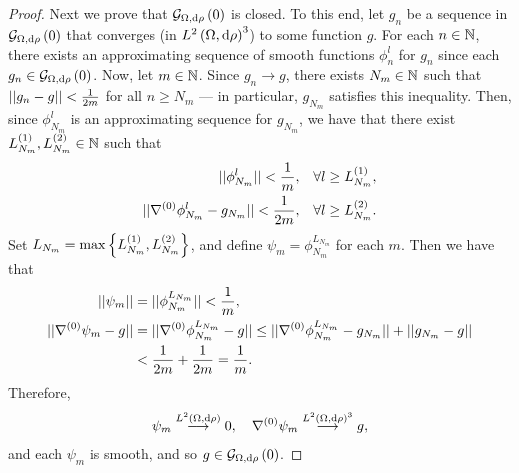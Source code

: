 \documentclass[11pt]{report}
\newcommand{\ograd}{\grad^{(0)}}
\begin{document}
\begin{proof}
	Next we prove that $\mathcal{G}_{ \Omega, \mathrm{d}\rho}\left( 0 \right)$ is closed.
	To this end, let $g_n$ be a sequence in $\mathcal{G}_{ \Omega, \mathrm{d}\rho}\left( 0 \right)$ that converges (in $L^{2}\left( \Omega,\mathrm{d}\rho \right)^3$) to some function $g$.
	For each $n\in\mathbb{N}$, there exists an approximating sequence of smooth functions $\phi_n^l$ for $g_n$ since each $g_n\in\mathcal{G}_{ \Omega, \mathrm{d}\rho}\left( 0 \right)$.
	Now, let $m\in\mathbb{N}$.
	Since $g_n\rightarrow g$, there exists $N_m\in\mathbb{N}$ such that $\lvert\lvert g_n-g \rvert\rvert<\frac{1}{2m}$ for all $n\geq N_m$ --- in particular, $g_{N_m}$ satisfies this inequality.
	Then, since $\phi_{N_m}^l$ is an approximating sequence for $g_{N_m}$, we have that there exist $L_{N_m}^{(1)}, L_{N_m}^{(2)}\in\mathbb{N}$ such that
	\begin{align*}
		\norm{\phi_{N_m}^l} < \recip{m}, &\quad\forall l\geq L_{N_m}^{(1)}, \\
		\norm{\ograd\phi_{N_m}^l - g_{N_m}} < \recip{2m}, &\quad\forall l\geq L_{N_m}^{(2)}.
	\end{align*}	 
	Set $L_{N_m} = \max\left\{  L_{N_m}^{(1)}, L_{N_m}^{(2)}  \right\}$, and define $\psi_m = \phi^{L_{N_m}}_{N_m}$ for each $m$.
	Then we have that
	\begin{align*}
		\norm{\psi_m} &= \norm{\phi_{N_m}^{L_{N_m}}} < \recip{m}, \\
		\norm{\ograd\psi_m - g} &= \norm{\ograd\phi_{N_m}^{L_{N_m}} - g}
		\leq \norm{\ograd\phi_{N_m}^{L_{N_m}} - g_{N_m}} + \norm{g_{N_m} - g} \\
		&< \recip{2m} + \recip{2m} = \recip{m}.
	\end{align*}
	Therefore,
	\begin{align*}
		\psi_m \lconv{\ltwo{\ddom}{\rho}} 0, \quad \ograd\psi_m \lconv{\ltwo{\ddom}{\rho}^3} g,
	\end{align*}
	and each $\psi_m$ is smooth, and so $g\in\mathcal{G}_{ \Omega, \mathrm{d}\rho}\left( 0 \right)$.
\end{proof}
\end{document}
